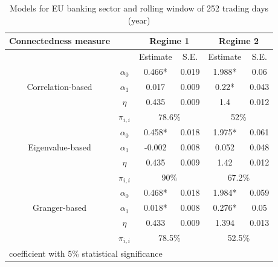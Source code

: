 \documentclass{article}
\begin{document}
\begin{table}
  \caption{Models for EU banking sector and rolling window of 252 trading days (year)}
  \begin{tabular}{cccccc}
    \toprule
     Connectedness measure &  & \multicolumn{2}{c}{\bfseries Regime 1} & \multicolumn{2}{c}{\bfseries Regime 2}  \\
     \hline
     & & Estimate & S.E. & Estimate & S.E. \\
     \hline
     \multirow{3}{*}[\normalbaselineskip]{Correlation-based} & $\alpha_0$ & 0.466* & 0.019 & 1.988*  & 0.06 \\
      & $\alpha_1$ & 0.017 & 0.009 & 0.22* & 0.043 \\
      & $\eta$ & 0.435 & 0.009 & 1.4 & 0.012 \\
      & $\pi_{i,i}$ &  \multicolumn{2}{c}{78.6\%} & \multicolumn{2}{c}{52\%}\\
      \hline
      \multirow{3}{*}[\normalbaselineskip]{Eigenvalue-based} & $\alpha_0$ & 0.458* & 0.018 & 1.975*  & 0.061 \\
      & $\alpha_1$ & -0.002 & 0.008 & 0.052 & 0.048 \\
      & $\eta$ & 0.435 & 0.009 & 1.42 & 0.012 \\
      & $\pi_{i,i}$ &  \multicolumn{2}{c}{90\%} & \multicolumn{2}{c}{67.2\%}\\
      \hline
      \multirow{3}{*}[\normalbaselineskip]{Granger-based} & $\alpha_0$ & 0.468* & 0.018 & 1.984*  & 0.059 \\
      & $\alpha_1$ & 0.018* & 0.008 & 0.276* & 0.05 \\
      & $\eta$ & 0.433 & 0.009 & 1.394 & 0.013 \\
      & $\pi_{i,i}$ &  \multicolumn{2}{c}{78.5\%} & \multicolumn{2}{c}{52.5\%}\\
      \hline
    \multicolumn{6}{l}{\footnotesize * coefficient with 5\% statistical significance} \\
    \hline
  \end{tabular}
\end{table}
\end{document}
